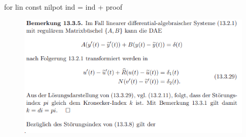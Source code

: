 for lin const nilpot ind  = ind + proof

\begin{figure}[H]
	\centering
	\includegraphics[width=0.7\linewidth]{screenshot005}
	\caption{}
	\label{fig:screenshot005}
\end{figure}